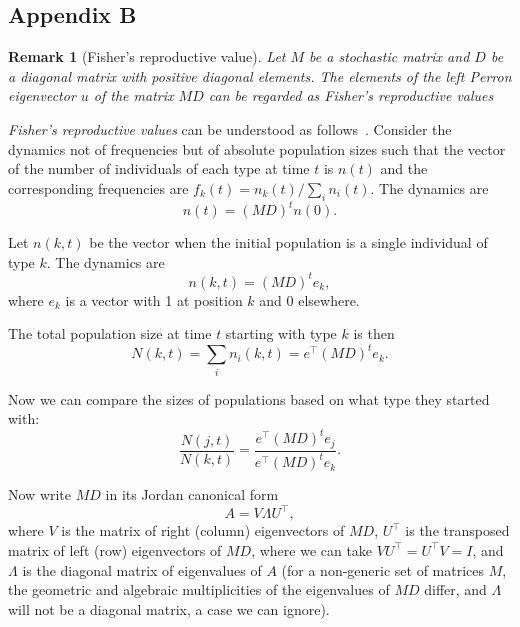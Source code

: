 \documentclass[9pt, a4paper, twocolumn]{extarticle}
\newcommand*{\tr}{^\intercal}
\newtheorem{remark}{Remark}
\begin{document}
\subsection*{Appendix B}\label{sec:AppB}
\begin{remark}[Fisher's reproductive value]
Let $M$ be a stochastic matrix and $D$ be a diagonal matrix with positive diagonal elements. 
The elements of the left \emph{Perron} eigenvector $u$ of the matrix $MD$ can be regarded as \emph{Fisher's reproductive values}~\citep[pg.~27]{Fisher1930}
\end{remark}

\emph{Fisher's reproductive values} can be understood as follows~\citep[ch.~10]{Grafen2006,Otto2007}.
Consider the dynamics not of frequencies but of absolute population sizes such that the vector of the number of individuals of each type at time $t$ is $n(t)$ and the corresponding frequencies are $f_k(t) = n_k(t) / \sum_i{n_i(t)}$.
The dynamics are
\begin{equation}
n(t) = (MD)^t n(0).
\end{equation}

Let $n(k, t)$ be the vector when the initial population is a single individual of type $k$.
The dynamics are
\begin{equation}
n(k,t) = (MD)^t e_k,
\end{equation}
where $e_k$ is a vector with 1 at position $k$ and 0 elsewhere.

The total population size at time $t$ starting with type $k$ is then
\begin{equation}
N(k,t) = \sum_i{n_i(k,t)} = e\tr (MD)^t e_k.
\end{equation}

Now we can compare the sizes of populations based on what type they started
with:
\begin{equation}
\frac{N(j,t)}{N(k,t)} = \frac{e\tr (MD)^t e_j}{e\tr (MD)^t e_k}.
\end{equation}

Now write $MD$ in its Jordan canonical form 
\begin{equation}
A = V \Lambda U\tr,
\end{equation}
where $V$ is the matrix of right (column) eigenvectors of $MD$,
$U\tr$ is the transposed matrix of left (row) eigenvectors of $MD$,
where we can take $V U\tr = U\tr V = I$, 
and $\Lambda$ is the diagonal matrix of eigenvalues of $A$ 
(for a non-generic set of matrices $M$, the geometric and algebraic multiplicities of the eigenvalues of $MD$ differ, and $\Lambda$ will not be a diagonal matrix, a case we can ignore).
\end{document}
